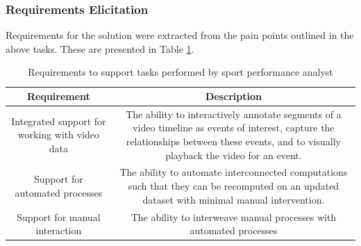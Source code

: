 {}

\subsubsection{Requirements Elicitation}

{Requirements for the solution were extracted from the pain points outlined in the above tasks. These are presented in Table
\ref{Tasks}.}

\pagebreak{}
\begin{longtable}[c]{cc}
  \caption{Requirements to support tasks performed by sport performance analyst} \label{Tasks} \\
\toprule
\begin{minipage}[t]{0.47\columnwidth}\raggedright\strut
{\textbf{Requirement}}
\strut\end{minipage} &
\begin{minipage}[t]{0.47\columnwidth}\raggedright\strut
{\textbf{Description}}
\strut\end{minipage}\tabularnewline
\midrule
\begin{minipage}[t]{0.47\columnwidth}\raggedright\strut
{Integrated support for working with video data}
\strut\end{minipage} &
\begin{minipage}[t]{0.47\columnwidth}\raggedright\strut
{The ability to interactively annotate segments of a video timeline as
events of interest, capture the relationships between these events, and
to visually playback the video for an event. }
\strut\end{minipage}\tabularnewline
\midrule
\begin{minipage}[t]{0.47\columnwidth}\raggedright\strut
{Support for automated processes}
\strut\end{minipage} &
\begin{minipage}[t]{0.47\columnwidth}\raggedright\strut
{The ability to automate interconnected computations such that they can
be recomputed on an updated dataset with minimal manual intervention.}
\strut\end{minipage}\tabularnewline
\midrule
\begin{minipage}[t]{0.47\columnwidth}\raggedright\strut
{Support for manual interaction}
\strut\end{minipage} &
\begin{minipage}[t]{0.47\columnwidth}\raggedright\strut
{The ability to interweave manual processes with automated processes
}
\end{minipage}
\end{longtable}
